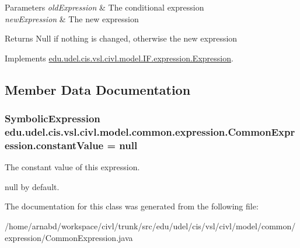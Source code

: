 \begin{DoxyParams}{Parameters}
{\em old\+Expression} & The conditional expression \\
\hline
{\em new\+Expression} & The new expression \\
\hline
\end{DoxyParams}
\begin{DoxyReturn}{Returns}
Null if nothing is changed, otherwise the new expression 
\end{DoxyReturn}


Implements \hyperlink{interfaceedu_1_1udel_1_1cis_1_1vsl_1_1civl_1_1model_1_1IF_1_1expression_1_1Expression_ad75ad1489d970dd9210bafa9b5b2e75c}{edu.\+udel.\+cis.\+vsl.\+civl.\+model.\+I\+F.\+expression.\+Expression}.



\subsection{Member Data Documentation}
\hypertarget{classedu_1_1udel_1_1cis_1_1vsl_1_1civl_1_1model_1_1common_1_1expression_1_1CommonExpression_a7e87d87775778380f166d4704c0dc269}{}
\subsubsection[{constant\+Value}]{\setlength{\rightskip}{0pt plus 5cm}Symbolic\+Expression edu.\+udel.\+cis.\+vsl.\+civl.\+model.\+common.\+expression.\+Common\+Expression.\+constant\+Value = null\hspace{0.3cm}{\ttfamily [protected]}}\label{classedu_1_1udel_1_1cis_1_1vsl_1_1civl_1_1model_1_1common_1_1expression_1_1CommonExpression_a7e87d87775778380f166d4704c0dc269}


The constant value of this expression. 

null by default. 

The documentation for this class was generated from the following file\+:\begin{DoxyCompactItemize}
\item 
/home/arnabd/workspace/civl/trunk/src/edu/udel/cis/vsl/civl/model/common/expression/Common\+Expression.\+java\end{DoxyCompactItemize}
